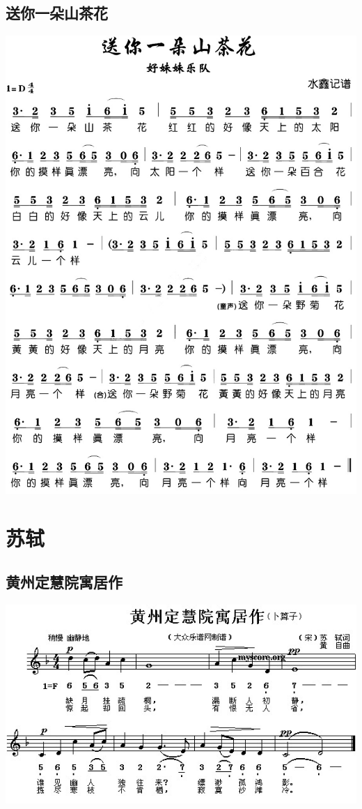 \documentclass[cn,pad,twocol]{elegantbook}
\begin{document}
\section{送你一朵山茶花}  \includegraphics[width=\textwidth]{dongxiao/20200516-好妹妹-送你一朵山茶花.jpg}


\chapter{苏轼}
\section{黄州定慧院寓居作}          \includegraphics[width=\textwidth]{dongxiao/20200627-苏轼-黄州定慧院寓居作.jpg} 
\end{document}
